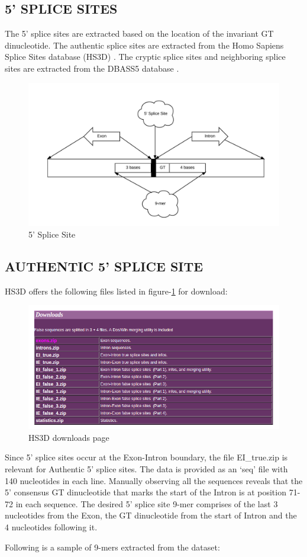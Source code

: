 \documentclass[12pt,a4paper]{article}
\begin{document}
    \subsection{5' SPLICE SITES}
    The 5’ splice sites are extracted based on the location of the invariant GT dinucleotide. The authentic splice sites are extracted from the Homo Sapiens Splice Sites database (HS3D) \cite{hs3d1,hs3d-2}. The cryptic splice sites and neighboring splice sites are extracted from the DBASS5 database \cite{dbass-0, dbass3}.
   	\begin{figure}[h]
   		\includegraphics[width=\textwidth]{fiveprime}
   		\caption{5' Splice Site}
   		\centering
   	\end{figure}

	\subsection{AUTHENTIC 5' SPLICE SITE}
	HS3D offers the following files listed in figure-\ref{fig:hs3d_download} for download:
   	\begin{figure}[H]
   		\includegraphics[width=\textwidth]{"hs3d_download"}
   		\caption{HS3D downloads page}
   		\centering
   		\label{fig:hs3d_download}
   	\end{figure}
	\par Since 5’ splice sites occur at the Exon-Intron boundary, the file EI\_true.zip is relevant for Authentic 5’ splice sites. The data is provided as an ‘seq’ file with 140 nucleotides in each line. Manually observing all the sequences reveals that the 5’ consensus GT dinucleotide that marks the start of the Intron is at position 71-72 in each sequence. The desired 5’ splice site 9-mer comprises of the last 3 nucleotides from the Exon, the GT dinucleotide from the start of Intron and the 4 nucleotides following it. \par
	Following is a sample of 9-mers extracted from the dataset:
	
\end{document}
